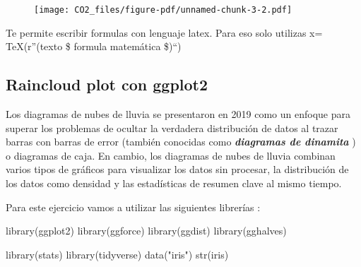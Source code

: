 \documentclass[
  letterpaper,
  DIV=11,
  numbers=noendperiod]{scrartcl}
\newenvironment{Shaded}{\begin{snugshade}}{\end{snugshade}}
\newcommand{\FunctionTok}[1]{\textcolor[rgb]{0.28,0.35,0.67}{#1}}
\newcommand{\NormalTok}[1]{\textcolor[rgb]{0.00,0.23,0.31}{#1}}
\newcommand{\StringTok}[1]{\textcolor[rgb]{0.13,0.47,0.30}{#1}}
\begin{document}
\begin{figure}[H]

{\centering \texttt{[image: CO2\_files/figure-pdf/unnamed-chunk-3-2.pdf]}

}

\end{figure}

\begin{tcolorbox}[enhanced jigsaw, rightrule=.15mm, coltitle=black, opacitybacktitle=0.6, arc=.35mm, toptitle=1mm, breakable, bottomrule=.15mm, leftrule=.75mm, colback=white, title=\textcolor{quarto-callout-note-color}{\faInfo}\hspace{0.5em}{La library(latex2exp)}, bottomtitle=1mm, titlerule=0mm, toprule=.15mm, colframe=quarto-callout-note-color-frame, colbacktitle=quarto-callout-note-color!10!white, left=2mm, opacityback=0]
Te permite escribir formulas con lenguaje latex. Para eso solo utilizas
x= TeX(r''(texto \$ formula matemática \$)``)
\end{tcolorbox}

\hypertarget{raincloud-plot-con-ggplot2}{%
\subsection{Raincloud plot con
ggplot2}\label{raincloud-plot-con-ggplot2}}

Los diagramas de nubes de lluvia se presentaron en 2019 como un enfoque
para superar los problemas de ocultar la verdadera distribución de datos
al trazar barras con barras de error (también conocidas como
\textbf{\emph{diagramas de dinamita}} ) o diagramas de caja. En cambio,
los diagramas de nubes de lluvia combinan varios tipos de gráficos para
visualizar los datos sin procesar, la distribución de los datos como
densidad y las estadísticas de resumen clave al mismo tiempo.

Para este ejercicio vamos a utilizar las siguientes librerías :

\begin{Shaded}
\begin{Highlighting}[]
\FunctionTok{library}\NormalTok{(ggplot2)}
\FunctionTok{library}\NormalTok{(ggforce)}
\FunctionTok{library}\NormalTok{(ggdist)}
\FunctionTok{library}\NormalTok{(gghalves)}
\end{Highlighting}
\end{Shaded}

\begin{Shaded}
\begin{Highlighting}[]
\FunctionTok{library}\NormalTok{(stats)}
\FunctionTok{library}\NormalTok{(tidyverse)}
\FunctionTok{data}\NormalTok{(}\StringTok{"iris"}\NormalTok{)}
\FunctionTok{str}\NormalTok{(iris)}
\end{Highlighting}
\end{Shaded}
\end{document}
